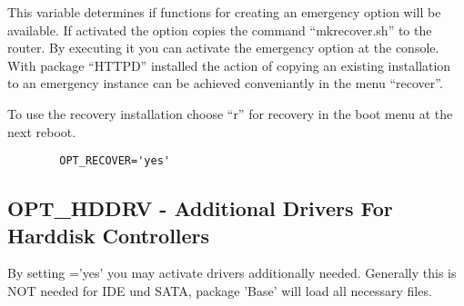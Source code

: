         This variable determines if functions for creating an emergency option 
        will be available.
        If activated the option copies the command ``mkrecover.sh'' to the router. 
        By executing it you can activate the emergency option at the console. With package
        ``HTTPD'' installed the action of copying an existing installation to an emergency 
        instance can be achieved conveniantly in the menu ``recover''.

        To use the recovery installation choose ``r'' for recovery in the boot menu at 
        the next reboot.

\begin{example}
\begin{verbatim}
        OPT_RECOVER='yes'
\end{verbatim}
\end{example}

\subsection {OPT\_HDDRV - Additional Drivers For Harddisk Controllers}

    By setting ='yes' you may activate drivers additionally needed.
    Generally this is NOT needed for IDE und SATA, package 'Base' will load all necessary files.

